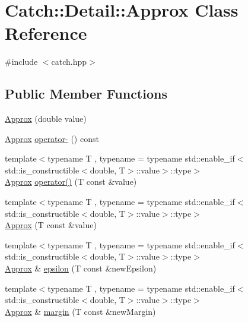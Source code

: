 \hypertarget{class_catch_1_1_detail_1_1_approx}{}\section{Catch\+:\+:Detail\+:\+:Approx Class Reference}
\label{class_catch_1_1_detail_1_1_approx}


{\ttfamily \#include $<$catch.\+hpp$>$}

\subsection*{Public Member Functions}
\begin{DoxyCompactItemize}
\item 
\mbox{\hyperlink{class_catch_1_1_detail_1_1_approx_a1a8618ea8db08c66bd3d9fe8f74b957a}{Approx}} (double value)
\item 
\mbox{\hyperlink{class_catch_1_1_detail_1_1_approx}{Approx}} \mbox{\hyperlink{class_catch_1_1_detail_1_1_approx_aa9adf5f05e641df770039543d5067d30}{operator-\/}} () const
\item 
{\footnotesize template$<$typename T , typename  = typename std\+::enable\+\_\+if$<$std\+::is\+\_\+constructible$<$double, T$>$\+::value$>$\+::type$>$ }\\\mbox{\hyperlink{class_catch_1_1_detail_1_1_approx}{Approx}} \mbox{\hyperlink{class_catch_1_1_detail_1_1_approx_ad8b2757f4804f9a1d3fa674efb98c20e}{operator()}} (T const \&value)
\item 
{\footnotesize template$<$typename T , typename  = typename std\+::enable\+\_\+if$<$std\+::is\+\_\+constructible$<$double, T$>$\+::value$>$\+::type$>$ }\\\mbox{\hyperlink{class_catch_1_1_detail_1_1_approx_ab14b979fa8a37f21d037157fabed4072}{Approx}} (T const \&value)
\item 
{\footnotesize template$<$typename T , typename  = typename std\+::enable\+\_\+if$<$std\+::is\+\_\+constructible$<$double, T$>$\+::value$>$\+::type$>$ }\\\mbox{\hyperlink{class_catch_1_1_detail_1_1_approx}{Approx}} \& \mbox{\hyperlink{class_catch_1_1_detail_1_1_approx_acd26adba86a066b9f40dad467f23bc85}{epsilon}} (T const \&new\+Epsilon)
\item 
{\footnotesize template$<$typename T , typename  = typename std\+::enable\+\_\+if$<$std\+::is\+\_\+constructible$<$double, T$>$\+::value$>$\+::type$>$ }\\\mbox{\hyperlink{class_catch_1_1_detail_1_1_approx}{Approx}} \& \mbox{\hyperlink{class_catch_1_1_detail_1_1_approx_a6467dc18791e1a1f4c15c4fb63cf5051}{margin}} (T const \&new\+Margin)

\end{DoxyCompactItemize}
